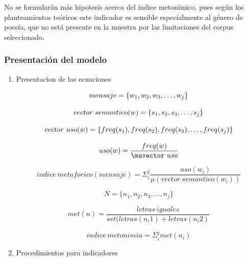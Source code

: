 \documentclass[twoside]{article}
\begin{document}
No se formularán más hipotesis acerca del índice metonímico, pues según los planteamientos teóricos este indicador
es sensible especialmente al género de poesía, que no está presente en la muestra por las limitaciones del corpus
seleccionado.



\subsubsection{Presentación del modelo}
\label{sec:org5882f3a}
\begin{enumerate}
\item Presentacion de las ecuaciones
\label{sec:org9efb332}

      \begin{equation}
mensaje = \{ w_1, w_2, w_3, \dots , w_j \} \\
\end{equation}

\begin{equation}
vector\ semantico(w) = \{s_1, s_2, s_3, \dots, s_j \} \\
\end{equation}

\begin{equation}
vector\ uso(w) = \{freq(s_1),freq(s_2),freq(s_3), \dots, freq(s_j) \} \\
\end{equation}

\begin{equation}
uso(w) = \frac{freq(w)}{\muvector\ uso}
\end{equation}


\begin{equation}
indice\ metaforico(mensaje) =  \Sigma_i^j \frac{uso(w_i)}{\mu( vector\ semantico(w_i))}
\end{equation}


\begin{equation}
N = \{n_1, n_2, n_3, \dots , n_j\}
\end{equation}

\begin{equation}
met(n) = \frac{letras\ iguales}{ set(letras(n_i1) + letras(n_i2)}
\end{equation}

\begin{equation}
indice\ metonimia = \Sigma_i^j met(n_i)
\end{equation}

\item Procedimientos para indicadores
\label{sec:orgcab4efb}


\end{enumerate}
\end{document}
